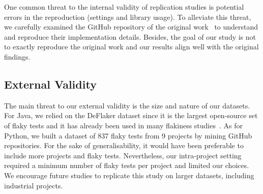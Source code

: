 One common threat to the internal validity of replication studies is potential errors in the reproduction (\eg settings and library usage). 
To alleviate this threat, we carefully examined the GitHub repository of the original work~\cite{damorimR19:online} to understand and reproduce their implementation details. 
Besides, the goal of our study is not to exactly reproduce the original work and our results align well with the original findings.

\subsection{External Validity}
The main threat to our external validity is the size and nature of our datasets.
For Java, we relied on the DeFlaker dataset since it is the largest open-source set of flaky tests and it has already been used in many flakiness studies~\cite{Bertolino2020,Pinto2020}.
As for Python, we built a dataset of 837 flaky tests from 9 projects by mining GitHub repositories.
For the sake of generalisability, it would have been preferable to include more projects and flaky tests.
Nevertheless, our intra-project setting required a minimum number of flaky tests per project and limited our choices.
We encourage future studies to replicate this study on larger datasets, including industrial projects.